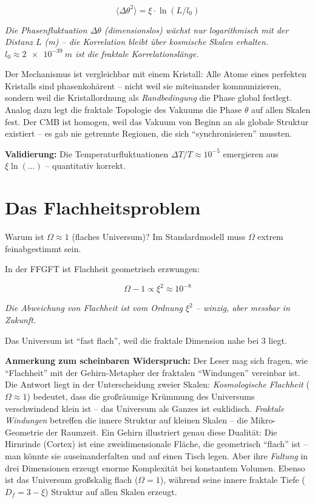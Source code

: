 	\begin{equation}
		\langle \Delta \theta^2 \rangle = \xi \cdot \ln(L / l_0)
	\end{equation}
	
	\textit{Die Phasenfluktuation $\Delta \theta$ (dimensionslos) wächst nur logarithmisch mit der Distanz $L$ (m) -- die Korrelation bleibt über kosmische Skalen erhalten. $l_0 \approx \SI{2e-39}{m}$ ist die fraktale Korrelationslänge.}
	
	Der Mechanismus ist vergleichbar mit einem Kristall: Alle Atome eines perfekten Kristalls sind phasenkohärent -- nicht weil sie miteinander kommunizieren, sondern weil die Kristallordnung als \textit{Randbedingung} die Phase global festlegt. Analog dazu legt die fraktale Topologie des Vakuums die Phase $\theta$ auf allen Skalen fest. Der CMB ist homogen, weil das Vakuum von Beginn an als globale Struktur existiert -- es gab nie getrennte Regionen, die sich \enquote{synchronisieren} mussten.
	
	\textbf{Validierung:} Die Temperaturfluktuationen \(\Delta T/T \approx 10^{-5}\) emergieren aus \(\xi \ln(\ldots)\) – quantitativ korrekt.
	
	\section{Das Flachheitsproblem}
	
	Warum ist \(\Omega \approx 1\) (flaches Universum)? Im Standardmodell muss \(\Omega\) extrem feinabgestimmt sein.
	
	In der FFGFT ist Flachheit geometrisch erzwungen:
	
	\begin{equation}
		\Omega - 1 \propto \xi^2 \approx 10^{-8}
	\end{equation}
	
	\textit{Die Abweichung von Flachheit ist vom Ordnung \(\xi^2\) – winzig, aber messbar in Zukunft.}
	
	Das Universum ist \enquote{fast flach}, weil die fraktale Dimension nahe bei 3 liegt.
	
	\textbf{Anmerkung zum scheinbaren Widerspruch:} Der Leser mag sich fragen, wie \enquote{Flachheit} mit der Gehirn-Metapher der fraktalen \enquote{Windungen} vereinbar ist. Die Antwort liegt in der Unterscheidung zweier Skalen: \textit{Kosmologische Flachheit} ($\Omega \approx 1$) bedeutet, dass die großräumige Krümmung des Universums verschwindend klein ist -- das Universum als Ganzes ist euklidisch. \textit{Fraktale Windungen} betreffen die innere Struktur auf kleinen Skalen -- die Mikro-Geometrie der Raumzeit. Ein Gehirn illustriert genau diese Dualität: Die Hirnrinde (Cortex) ist eine zweidimensionale Fläche, die geometrisch \enquote{flach} ist -- man könnte sie auseinanderfalten und auf einen Tisch legen. Aber ihre \textit{Faltung} in drei Dimensionen erzeugt enorme Komplexität bei konstantem Volumen. Ebenso ist das Universum großskalig flach ($\Omega = 1$), während seine innere fraktale Tiefe ($D_f = 3 - \xi$) Struktur auf allen Skalen erzeugt.
	
